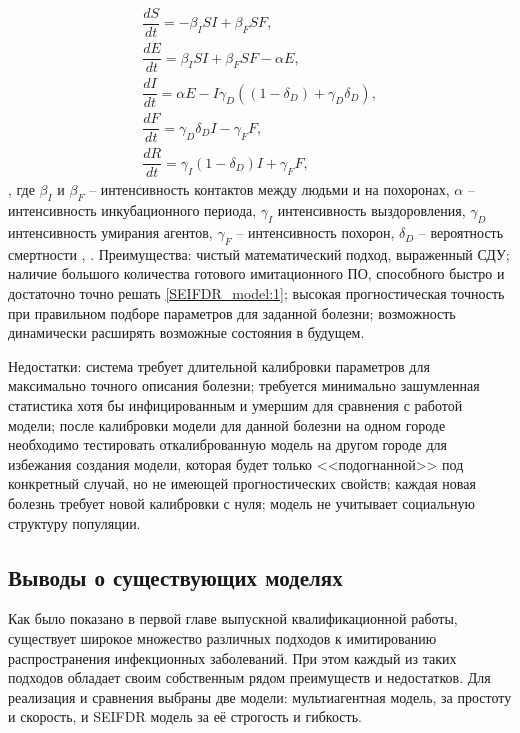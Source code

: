 \begin{gather} 
\nonumber	\dfrac{dS}{dt} = -\beta_I S I + \beta_F S F, \\
\nonumber	\dfrac{dE}{dt} = \beta_I S I + \beta_F S F - \alpha E, \\
	\dfrac{dI}{dt} = \alpha E - I \gamma_D ( (1 - \delta_D) + \gamma_D \delta_D), \label{SEIFDR_model:1} \\
\nonumber	\dfrac{dF}{dt} = \gamma_D \delta_D I - \gamma_F F, \\
\nonumber	\dfrac{dR}{dt} = \gamma_I(1-\delta_D) I + \gamma_F F,
\end{gather}
,  где $\beta_I$ и $\beta_F$ -- интенсивность контактов между людьми и на похоронах, $\alpha$ --  интенсивность инкубационного периода, $\gamma_I$ интенсивность выздоровления, $\gamma_D$  интенсивность умирания агентов, $\gamma_F$ --   интенсивность похорон, $\delta_D$ -- вероятность смертности 
\cite{Plos_Outbreak:1}, \cite{Plos_Outbreak:2}. 
Преимущества: чистый математический подход, выраженный СДУ; наличие большого количества готового имитационного ПО, способного быстро и достаточно точно решать \eqref{SEIFDR_model:1}; высокая прогностическая точность при правильном подборе параметров для заданной болезни; возможность динамически расширять возможные состояния в будущем.

Недостатки: система требует длительной калибровки параметров для максимально точного описания болезни; требуется минимально зашумленная статистика хотя бы инфицированным и умершим для сравнения с работой модели; после калибровки модели для данной болезни на одном городе необходимо тестировать откалиброванную модель на другом городе для избежания создания модели, которая будет только <<подогнанной>> под конкретный случай, но не имеющей прогностических свойств; каждая новая болезнь требует новой калибровки с нуля; модель не учитывает социальную структуру популяции.
\subsection{Выводы о существующих моделях}


Как было показано в первой главе выпускной квалификационной работы, существует широкое множество различных подходов к имитированию распространения инфекционных заболеваний. При этом каждый из таких подходов обладает своим собственным рядом преимуществ и недостатков. Для реализация и сравнения выбраны две модели: мультиагентная модель, за простоту и скорость, и SEIFDR модель за её строгость и гибкость.
